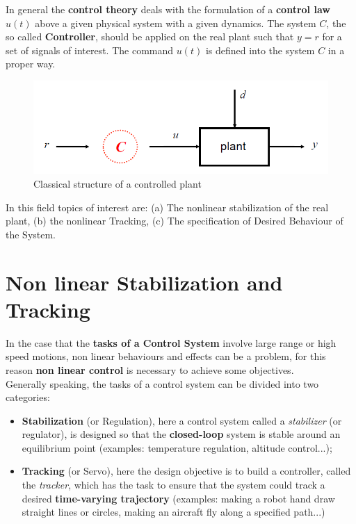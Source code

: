 In general the \textbf{control theory} deals with the formulation of a \textbf{control law} $u(t)$ above a given physical system with a given dynamics. The system $C$, the so called \textbf{Controller}, should be applied on the real plant such that $y = r$ for a set of signals of interest. The command $u(t)$ is defined into the system $C$ in a proper way.\\

\begin{figure}[h]
    \centering
    \includegraphics[scale=0.8]{NonLinearControl/images/ControlScheme.png}
    \caption{Classical structure of a controlled plant}
    \label{fig:enter-label}
\end{figure}

\noindent
In this field topics of interest are: (a) The nonlinear stabilization of the real  plant, (b) the nonlinear Tracking, (c) The specification of Desired Behaviour of the System. 

\section{Non linear Stabilization and Tracking}
In the case that the \textbf{tasks of a Control System} involve large range or high speed motions, non linear behaviours and effects can be a problem, for this reason \textbf{non linear control} is necessary to achieve some objectives. \\
Generally speaking, the tasks of a control system can be divided into two categories: 
\begin{itemize}
    \item \textbf{Stabilization} (or Regulation), here a control system called a \textit{stabilizer} (or regulator), is designed so that the \textbf{closed-loop} system is stable around an equilibrium point (examples: temperature regulation, altitude control...);
    \item \textbf{Tracking} (or Servo), here the design objective is to build a controller, called the \textit{tracker}, which has the task to ensure that the system could track a desired \textbf{time-varying trajectory} (examples: making a robot hand draw straight lines or circles, making an aircraft fly along a specified path...)
\end{itemize}

